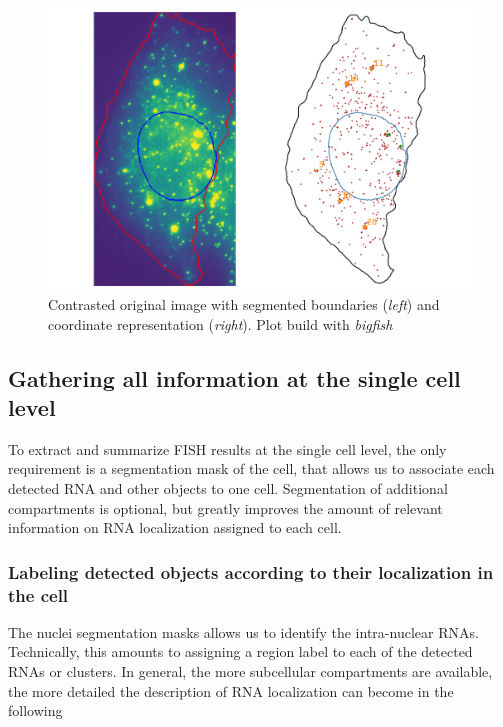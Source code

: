 \begin{figure}[]
    \centering
    \includegraphics[width=\textwidth]{figures/chapter4/cell_extracted_0}
    \caption[Coordinate representation of a cell]{Contrasted original image with segmented boundaries (\textit{left}) and coordinate representation (\textit{right}).
	Plot build with \emph{bigfish}}
    \label{fig:cell_extracted_0}
\end{figure}

\subsection{Gathering all information at the single cell level}

To extract and summarize \ac{FISH} results at the single cell level, the only requirement is a segmentation mask of the cell, that allows us to associate each detected \ac{RNA} and other objects to one cell. Segmentation of additional compartments is optional, but greatly improves the amount of relevant information on \ac{RNA} localization assigned to each cell. 

\subsubsection{Labeling detected objects according to their localization in the cell}
The nuclei segmentation masks allows us to identify the intra-nuclear RNAs.
Technically, this amounts to assigning a region label to each of the detected RNAs or clusters. In general, the more subcellular compartments are available, the more detailed the description of RNA localization can become in the following

